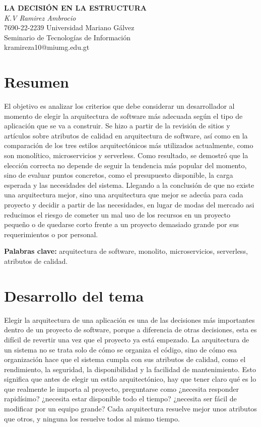 \documentclass[12pt,letterpaper]{article}
\begin{document}
\begin{center}
{\bfseries LA DECISIÓN EN LA ESTRUCTURA}\\[4pt]
\textit{K.V Ramirez Ambrocio}\\
7690-22-2239 \quad Universidad Mariano Gálvez\\
Seminario de Tecnologías de Información\\
kramireza10@miumg.edu.gt
\end{center}

\vspace{6pt}

\section*{Resumen}
El objetivo es analizar los criterios que debe considerar un desarrollador al momento de elegir la arquitectura de software más adecuada según el tipo de aplicación que se va a construir. Se hizo a partir de la revisión de sitios y artículos sobre atributos de calidad en arquitectura de software, así como en la comparación de los tres estilos arquitectónicos más utilizados actualmente, como son monolítico, microservicios y serverless. Como resultado, se demostró que la elección correcta no depende de seguir la tendencia más popular del momento, sino de evaluar puntos concretos, como el presupuesto disponible, la carga esperada y las necesidades del sistema. Llegando a la conclusión de que no existe una arquitectura mejor, sino una arquitectura que mejor se adecúa para cada proyecto y decidir a partir de las necesidades, en lugar de modas del mercado asi reducimos el riesgo de cometer un mal uso de los recursos en un proyecto pequeño o de quedarse corto frente a un proyecto demasiado grande por sus requerimientos o por personal.  

\textbf{Palabras clave:} arquitectura de software, monolito, microservicios, serverless, atributos de calidad.

\section*{Desarrollo del tema}

Elegir la arquitectura de una aplicación es una de las decisiones más importantes dentro de un proyecto de software, porque a diferencia de otras decisiones, esta es difícil de revertir una vez que el proyecto ya está empezado. La arquitectura de un sistema no se trata solo de cómo se organiza el código, sino de cómo esa organización hace que el sistema cumpla con sus atributos de calidad, como el rendimiento, la seguridad, la disponibilidad y la facilidad de mantenimiento. Esto significa que antes de elegir un estilo arquitectónico, hay que tener claro qué es lo que realmente le importa al proyecto, preguntarse como ¿necesita responder rapidísimo? ¿necesita estar disponible todo el tiempo? ¿necesita ser fácil de modificar por un equipo grande? Cada arquitectura resuelve mejor unos atributos que otros, y ninguna los resuelve todos al mismo tiempo.
\end{document}
